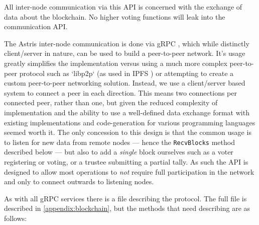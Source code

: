 All inter-node communication via this API is concerned with the exchange of data about the blockchain. No higher voting functions will leak into the communication API.

The Astris inter-node communication is done via gRPC  , which while distinctly client/server in nature, can be used to build a peer-to-peer network. It's usage greatly simplifies the implementation versus using a much more complex peer-to-peer protocol such as `libp2p` (as used in IPFS ) or attempting to create a custom peer-to-peer networking solution. Instead, we use a client/server based system to connect a peer in each direction. This means two connections per connected peer, rather than one, but given the reduced complexity of implementation and the ability to use a well-defined data exchange format with existing implementations and code-generation for various programming languages seemed worth it. The only concession to this design is that the common usage is to listen for new data from remote nodes --- hence the \texttt{RecvBlocks} method described below --- but also to add a \emph{single} block ourselves such as a voter registering or voting, or a trustee submitting a partial tally. As such the API is designed to allow most operations to \emph{not} require full participation in the network and only to connect outwards to listening nodes.

As with all gRPC services there is a file describing the protocol. The full file is described in \autoref{appendix:blockchain}, but the methods that need describing are as follows:

